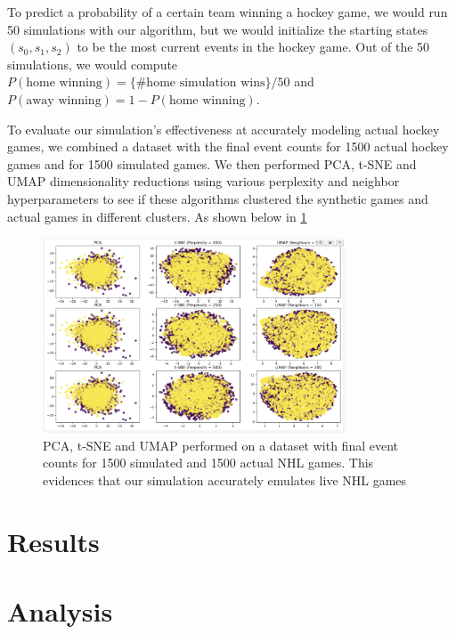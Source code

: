 \documentclass[11pt]{article}
\begin{document}
To predict a probability of a certain team winning a hockey game, we would run 50 simulations with our algorithm, but we would initialize the starting states $(s_0, s_1, s_2)$ to be the most current events in the hockey game. Out of the 50 simulations, we would compute $P(\text{home winning}) = \{\text{\# home simulation wins}\}/50$ and $P(\text{away winning}) = 1-P(\text{home winning})$.

To evaluate our simulation's effectiveness at accurately modeling actual hockey games, we combined a dataset with the final event counts for 1500 actual hockey games and for 1500 simulated games. We then performed PCA, t-SNE and UMAP dimensionality reductions using various perplexity and neighbor hyperparameters to see if these algorithms clustered the synthetic games and actual games in different clusters. As shown below in \ref{fig:simulation_v_actual}

\begin{figure}[H]
    \centering
    \includegraphics[width=0.8\textwidth]{images/simulation_v_actual_dimred.png}
    \caption{PCA, t-SNE and UMAP performed on a dataset with final event counts for 1500 simulated and 1500 actual NHL games. This evidences that our simulation accurately emulates live NHL games}
    \label{fig:simulation_v_actual}
\end{figure}




\section{Results}

\section{Analysis}
\end{document}
